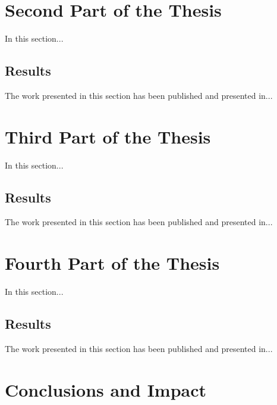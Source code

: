 \documentclass[12pt,journal,onecolumn,twoside]{IEEEtran}
\begin{document}
\section{Second Part of the Thesis}

In this section...

\subsection{Results}
The work presented in this section has been published and presented in...


\section{Third Part of the Thesis}

In this section...

\subsection{Results}
The work presented in this section has been published and presented in...


\section{Fourth Part of the Thesis}

In this section...

\subsection{Results}
The work presented in this section has been published and presented in...


\section{Conclusions and Impact}



\ifCLASSOPTIONcaptionsoff
  \newpage
\fi



\end{document}
